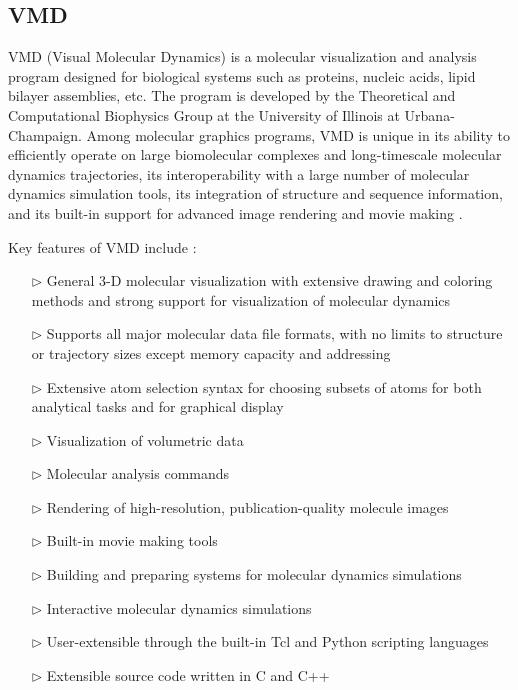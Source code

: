 \subsection{VMD}
VMD (Visual Molecular Dynamics) is a molecular visualization and analysis program designed for biological systems such as proteins, nucleic acids, lipid bilayer assemblies, etc. The program is developed by the Theoretical and Computational Biophysics Group at the University of Illinois at Urbana-Champaign. Among molecular graphics programs, VMD is unique in its ability to efficiently operate on large biomolecular complexes and long-timescale molecular dynamics trajectories, its interoperability with a large number of molecular dynamics simulation tools, its integration of structure and sequence information, and its built-in support for advanced image rendering and movie making \cite{humphrey1996vmd}.

Key features of VMD include \cite{ref:VMD_ug}:
\begin{itemize}
\item[$\triangleright$] General 3-D molecular visualization with extensive drawing and coloring methods and strong support for visualization of molecular dynamics
\item[$\triangleright$] Supports all major molecular data file formats, with no limits to structure or trajectory sizes except memory capacity and addressing
\item[$\triangleright$] Extensive atom selection syntax for choosing subsets of atoms for both analytical tasks and for graphical display
\item[$\triangleright$] Visualization of volumetric data
\item[$\triangleright$] Molecular analysis commands
\item[$\triangleright$] Rendering of high-resolution, publication-quality molecule images
\item[$\triangleright$] Built-in movie making tools
\item[$\triangleright$] Building and preparing systems for molecular dynamics simulations
\item[$\triangleright$] Interactive molecular dynamics simulations
\item[$\triangleright$] User-extensible through the built-in Tcl and Python scripting languages
\item[$\triangleright$] Extensible source code written in C and C++
\end{itemize}

